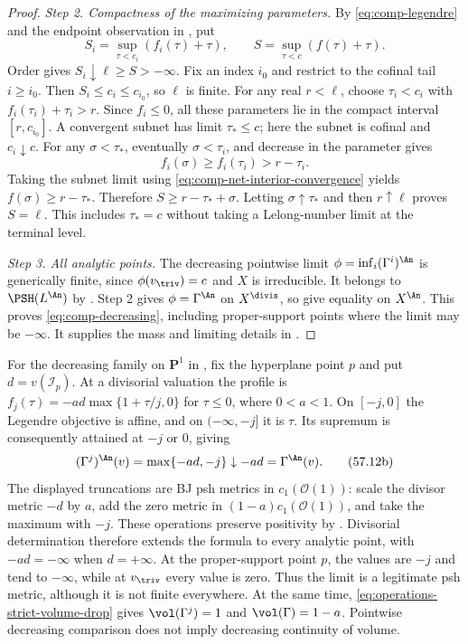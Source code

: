 \begin{proof}
\emph{Step 2. Compactness of the maximizing parameters.}
By \eqref{eq:comp-legendre} and the endpoint observation in
, put
\[
 S_i=\sup_{\tau<c_i}(f_i(\tau)+\tau),\qquad
 S=\sup_{\tau<c}(f(\tau)+\tau).
\]
Order gives $S_i\downarrow\ell\geq S> -\infty$.
Fix an index $i_0$ and restrict to the cofinal tail $i\geq i_0$.
Then $S_i\leq c_i\leq c_{i_0}$, so $\ell$ is finite.
For any real $r<\ell$, choose $\tau_i<c_i$ with
$f_i(\tau_i)+\tau_i>r$.
Since $f_i\leq0$, all these parameters lie in the compact
interval $[r,c_{i_0}]$.
A convergent subnet has limit $\tau_*\leq c$; here the subnet
is cofinal and $c_i\downarrow c$.
For any $\sigma<\tau_*$, eventually $\sigma<\tau_i$, and
decrease in the parameter gives
\[
                    f_i(\sigma)\geq f_i(\tau_i)>r-\tau_i.
\]
Taking the subnet limit using
\eqref{eq:comp-net-interior-convergence} yields
$f(\sigma)\geq r-\tau_*$.
Therefore $S\geq r-\tau_*+\sigma$.
Letting $\sigma\uparrow\tau_*$ and then $r\uparrow\ell$
proves $S=\ell$. This includes $\tau_*=c$ without taking a
Lelong-number limit at the terminal level.

\emph{Step 3. All analytic points.}
The decreasing pointwise limit
$\phi=\inf_i(\Gamma^i)^{\An}$ is generically finite, since
$\phi(v_{\triv})=c$ and $X$ is irreducible.
It belongs to $\PSH(L^{\An})$ by \cite[Theorem~4.5]{BJ22}.
Step 2 gives $\phi=\Gamma^{\An}$ on $X^{\divis}$, so
\cite[Theorem~4.22 and Corollary~4.23]{BJ22} give equality
on $X^{\An}$.
This proves \eqref{eq:comp-decreasing}, including proper-support
points where the limit may be $-\infty$.
It supplies the mass and limiting details in
\cite[Lemma~4.10]{XiaOperationsV3}.
\end{proof}

\begin{example}
\label{ex:comp-decreasing-truncations}
For the decreasing family on $\mathbf P^1$ in
, fix the hyperplane
point $p$ and put $d=v(\mathcal I_p)$.
At a divisorial valuation the profile is
$f_j(\tau)=-ad\max\{1+\tau/j,0\}$ for $\tau\leq0$,
where $0<a<1$.
On $[-j,0]$ the Legendre objective is affine, and on
$(-\infty,-j]$ it is $\tau$.
Its supremum is consequently attained at $-j$ or $0$, giving
\[
        (\Gamma^j)^{\An}(v)=\max\{-ad,-j\}
                 \downarrow -ad=\Gamma^{\An}(v).
\tag{57.12b}\label{eq:comp-truncation-limit}
\]
The displayed truncations are BJ psh metrics in $c_1(\mathcal O(1))$:
scale the divisor metric $-d$ by $a$, add the zero metric in
$(1-a)c_1(\mathcal O(1))$, and take the maximum with $-j$.
These operations preserve positivity by \cite[Theorem~4.7]{BJ22}.
Divisorial determination therefore extends the formula to every
analytic point, with $-ad=-\infty$ when $d=+\infty$.
At the proper-support point $p$, the values are $-j$ and tend to
$-\infty$, while at $v_{\triv}$ every value is zero.
Thus the limit is a legitimate psh metric, although it is not
finite everywhere. At the same time,
\eqref{eq:operations-strict-volume-drop} gives
$\vol(\Gamma^j)=1$ and $\vol(\Gamma)=1-a$.
Pointwise decreasing comparison does not imply decreasing
continuity of volume.
\end{example}

